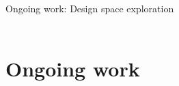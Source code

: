 \begin{frame}[c,noframenumbering]
	\centering
	\begin{titleblock}{}
		~\\%
		{\centering\LARGE Ongoing work: Design space exploration\\}%
		~\\%
	\end{titleblock}
\end{frame}
\section{Ongoing work}
